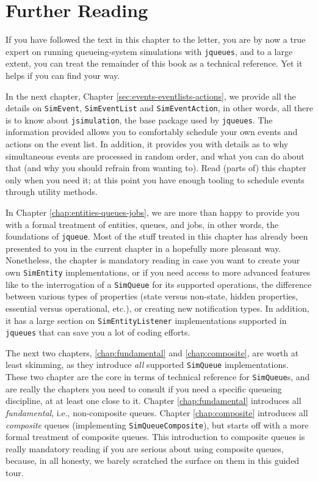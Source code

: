 \documentclass[12pt]{book}
\begin{document}
\section{Further Reading}
\label{sec:guided:further-reading}

If you have followed the text in this chapter to the letter,
  you are by now a true expert on running
  queueing-system simulations with \lstinline|jqueues|,
  and to a large extent,
  you can treat the remainder of this book
  as a technical reference.
Yet it helps if you can find your way.

In the next chapter, Chapter \ref{sec:events-eventlists-actions},
  we provide all the details on
  \lstinline|SimEvent|, \lstinline|SimEventList|
  and \lstinline|SimEventAction|,
  in other words,
  all there is to know about \lstinline|jsimulation|,
  the base package used by \lstinline|jqueues|.
The information provided allows you to comfortably
  schedule your own events and actions on the event list.
In addition,
  it provides you with details as to why
  simultaneous events are processed in random
  order,
  and what you can do about that
  (and why you should refrain from wanting to).
Read (parts of) this chapter only when you need it;
  at this point you have enough tooling
  to schedule events through utility methods.

In Chapter \ref{chap:entities-queues-jobs},
  we are more than happy to provide you
  with a formal treatment of
  entities, queues, and jobs,
  in other words,
  the foundations of \lstinline|jqueue|.
Most of the stuff treated in this chapter has already
  been presented to you in the current chapter
  in a hopefully more pleasant way.
Nonetheless, the chapter is mandatory reading
  in case you want to create your own
  \lstinline|SimEntity| implementations,
  or if you need access to more advanced features
  like to the interrogation of a \lstinline|SimQueue|
  for its supported operations,
  the difference between various types of
  properties (state versus non-state, hidden properties,
  essential versus operational, etc.),
  or creating new notification types.
In addition,
  it has a large section on \lstinline|SimEntityListener|
  implementations supported in \lstinline|jqueues|
  that can save you a lot of coding efforts.

The next two chapters,
  \ref{chap:fundamental} and \ref{chap:composite},
  are worth at least skimming,
  as they introduce {\em all\/}
  supported \lstinline|SimQueue|
  implementations.
These two chapter are the core in terms of
  technical reference for \lstinline|SimQueue|s,
  and are really the chapters you need to consult
  if you need a specific queueing discipline,
  at at least one close to it.
Chapter \ref{chap:fundamental} introduces all
  {\em fundamental\/},
  i.e.,
  non-composite queues.
Chapter \ref{chap:composite} introduces all {\em composite\/}
  queues (implementing \lstinline|SimQueueComposite|),
  but starts off with a more formal treatment
  of composite queues.
This introduction to composite queues is really
  mandatory reading if you are serious
  about using composite queues,
  because, in all honesty,
  we barely scratched the surface on them
  in this guided tour.
\end{document}
